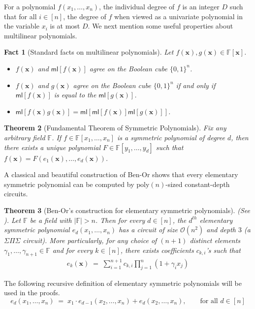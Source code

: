\documentclass[11pt]{article}
\newtheorem{theorem}{Theorem}[section]
\newtheorem{fact}[theorem]{Fact}
\newcommand{\Boo}{\{0,1 \}}
\newcommand{\bigO}{\mathcal{O}}
\newcommand{\F}{\mathbb{F}}
\newcommand{\ml}{\mathsf{ml}}
\begin{document}
\noindent
For a polynomial $f(x_{1},\ldots,x_{n})$, the individual degree of $f$ is an integer $D$ such that for all $i \in [n]$, the degree of $f$ when viewed as a univariate polynomial in the variable $x_{i}$ is at most $D$.\newline
We next mention some useful properties about multilinear polynomials.\\

\begin{fact}[Standard facts on multilinear polynomials]\label{fact:multilinear}
Let $f(\mathbf{x}), g(\mathbf{x}) \in \F[\mathbf{x}]$.
\begin{itemize}
    \item $f(\mathbf{x})$ and $\ml[f(\mathbf{x})]$ agree on the Boolean cube $\Boo^{n}$.
    \item $f(\mathbf{x})$ and $g(\mathbf{x})$ agree on the Boolean cube $\Boo^{n}$ if and only if $\ml[f(\mathbf{x})]$ is equal to the $\ml[g(\mathbf{x})]$.
    \item $\ml[f(\mathbf{x}) g(\mathbf{x})] = \ml[\ml[f(\mathbf{x})] \ml[g(\mathbf{x})]]$.
\end{itemize}
\end{fact}
\noindent



\begin{theorem}[Fundamental Theorem of Symmetric Polynomials]\label{thm:fundamental-sym}
Fix any arbitrary field $\F$. If $f \in \F[x_{1},\ldots,x_{n}]$ is a symmetric polynomial of degree $d$, then there exists a unique polynomial $F \in \F[y_{1},\ldots,y_{d}]$ such that $f(\mathbf{x}) = F(e_{1}(\mathbf{x}),\ldots,e_{d}(\mathbf{x}))$.
\end{theorem}

\noindent
A classical and beautiful construction of Ben-Or shows that every elementary symmetric polynomial can be computed by $\mathrm{poly}(n)$-sized constant-depth circuits.\\


\begin{theorem}[Ben-Or's construction for elementary symmetric polynomials]\label{thm:ben-or}
(See \cite[Theorem 5.1]{Shpilka-Wigderson}). Let $\F$ be a field with $|\F| > n$. Then for every $d \in [n]$, the $d^{th}$ elementary symmetric polynomial $e_{d}(x_{1},\ldots,x_{n})$ has a circuit of size $\bigO(n^{2})$ and depth $3$ (a $\Sigma \Pi \Sigma$ circuit).\newline
More particularly, for any choice of $(n+1)$ distinct elements $\gamma_{1},\ldots,\gamma_{n+1} \in \F$ and for every $k \in [n]$, there exists coefficients $c_{k,i}$'s such that
\begin{align*}
    e_{k}(\mathbf{x}) \; = \; \sum_{i=1}^{n+1} c_{k,i} \prod_{j=1}^{n} (1+\gamma_{i} x_{j})
\end{align*}
\end{theorem}
The following recursive definition of elementary symmetric polynomials will be used in the proofs.
\begin{equation}\label{eqn:recursive-elem-sym}
    e_{d}(x_{1},\ldots,x_{n}) \; = \; x_{1} \cdot e_{d-1}(x_{2},\ldots,x_{n}) + e_{d}(x_{2},\ldots,x_{n}), \quad \quad \text{for all } d \in [n]
\end{equation}
\end{document}
